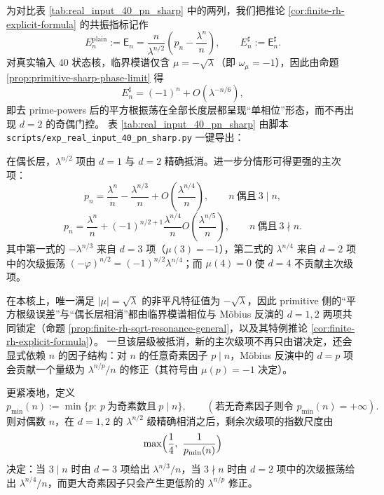 \begin{remark}\label{rem:real-input-40-pn-sharp}
为对比表 \ref{tab:real_input_40_pn_sharp} 中的两列，我们把推论 \ref{cor:finite-rh-explicit-formula} 的共振指标记作
\[
E_n^{\mathrm{plain}}
:=\mathsf{E}_n
=\frac{n}{\lambda^{n/2}}\left(p_n-\frac{\lambda^n}{n}\right),
\qquad
E_n^{\sharp}:=\mathsf{E}_n^\sharp.
\]
对真实输入 40 状态核，临界模谱仅含 \(\mu=-\sqrt{\lambda}\)（即 \(\omega_\mu=-1\)），因此由命题 \ref{prop:primitive-sharp-phase-limit} 得
\[
E_n^{\sharp}=(-1)^n+O(\lambda^{-n/6}),
\]
即去 prime-powers 后的平方根振荡在全部长度层都呈现“单相位”形态，而不再出现 \(d=2\) 的奇偶门控。
表 \ref{tab:real_input_40_pn_sharp} 由脚本 \texttt{scripts/exp\_real\_input\_40\_pn\_sharp.py} 一键导出：

\end{remark}

\begin{remark}\label{rem:finite-rh-even-strengthen}
在偶长层，$\lambda^{n/2}$ 项由 $d=1$ 与 $d=2$ 精确抵消。进一步分情形可得更强的主次项：
\[
p_n=\frac{\lambda^n}{n}-\frac{\lambda^{n/3}}{n}+O\!\left(\frac{\lambda^{n/4}}{n}\right),
\qquad n\ \text{偶且}\ 3\mid n,
\]
\[
p_n=\frac{\lambda^n}{n}+(-1)^{n/2+1}\frac{\lambda^{n/4}}{n}
O\!\left(\frac{\lambda^{n/5}}{n}\right),
\qquad n\ \text{偶且}\ 3\nmid n.
\]
其中第一式的 $-\lambda^{n/3}$ 来自 $d=3$ 项（$\mu(3)=-1$），第二式的 $\lambda^{n/4}$ 来自 $d=2$ 项中的次级振荡
$(-\varphi)^{n/2}=(-1)^{n/2}\lambda^{n/4}$；而 $\mu(4)=0$ 使 $d=4$ 不贡献主次级项。
\end{remark}

\begin{remark}\label{rem:finite-rh-factor-controls-secondary}
在本核上，唯一满足 $|\mu|=\sqrt{\lambda}$ 的非平凡特征值为 $-\sqrt{\lambda}$，因此 primitive 侧的“平方根级误差”与“偶长层相消”都由临界模谱相位与 Möbius 反演的 $d=1,2$ 两项共同锁定（命题 \ref{prop:finite-rh-sqrt-resonance-general}，以及其特例推论 \ref{cor:finite-rh-explicit-formula}）。
一旦该层级被抵消，新的主次级项不再只由谱决定，还会显式依赖 $n$ 的因子结构：对 $n$ 的任意奇素因子 $p\mid n$，Möbius 反演中的 $d=p$ 项会贡献一个量级为 $\lambda^{n/p}/n$ 的修正（其符号由 $\mu(p)=-1$ 决定）。
\par
更紧凑地，定义
\[
p_{\min}(n):=\min\{p:\ p\ \text{为奇素数且}\ p\mid n\},
\qquad(\text{若无奇素因子则令 }p_{\min}(n)=+\infty).
\]
则对偶数 $n$，在 $d=1,2$ 的 $\lambda^{n/2}$ 级精确相消之后，剩余次级项的指数尺度由
\[
\max\Bigl(\frac14,\ \frac{1}{p_{\min}(n)}\Bigr)
\]
决定：当 $3\mid n$ 时由 $d=3$ 项给出 $\lambda^{n/3}/n$，当 $3\nmid n$ 时由 $d=2$ 项中的次级振荡给出 $\lambda^{n/4}/n$，而更大奇素因子只会产生更低阶的 $\lambda^{n/p}$ 修正。
\end{remark}

